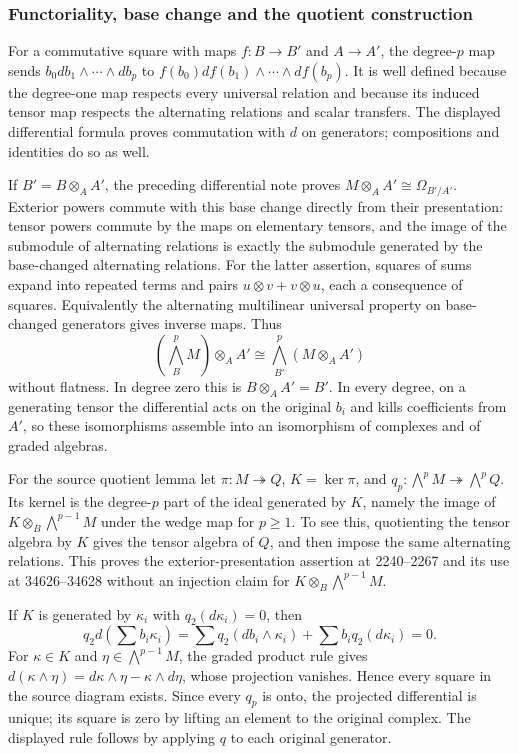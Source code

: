 \subsubsection{Functoriality, base change and the quotient construction}\label{functoriality-base-change-and-the-quotient-construction}

For a commutative square with maps \(f:B\to B'\) and \(A\to A'\), the degree-\(p\) map sends \(b_0db_1\wedge\cdots\wedge db_p\) to \(f(b_0)df(b_1)\wedge\cdots\wedge df(b_p)\). It is well defined because the degree-one map respects every universal relation and because its induced tensor map respects the alternating relations and scalar transfers. The displayed differential formula proves commutation with \(d\) on generators; compositions and identities do so as well.

If \(B'=B\otimes_A A'\), the preceding differential note proves \(M\otimes_A A'\cong\Omega_{B'/A'}\). Exterior powers commute with this base change directly from their presentation: tensor powers commute by the maps on elementary tensors, and the image of the submodule of alternating relations is exactly the submodule generated by the base-changed alternating relations. For the latter assertion, squares of sums expand into repeated terms and pairs \(u\otimes v+v\otimes u\), each a consequence of squares. Equivalently the alternating multilinear universal property on base-changed generators gives inverse maps. Thus \[
(\bigwedge_B^pM)\otimes_A A'\cong\bigwedge_{B'}^p(M\otimes_A A')
\] without flatness. In degree zero this is \(B\otimes_A A'=B'\). In every degree, on a generating tensor the differential acts on the original \(b_i\) and kills coefficients from \(A'\), so these isomorphisms assemble into an isomorphism of complexes and of graded algebras.

For the source quotient lemma let \(\pi:M\twoheadrightarrow Q\), \(K=\ker\pi\), and \(q_p:\bigwedge^pM\twoheadrightarrow\bigwedge^pQ\). Its kernel is the degree-\(p\) part of the ideal generated by \(K\), namely the image of \(K\otimes_B\bigwedge^{p-1}M\) under the wedge map for \(p\ge1\). To see this, quotienting the tensor algebra by \(K\) gives the tensor algebra of \(Q\), and then impose the same alternating relations. This proves the exterior-presentation assertion at 2240--2267 and its use at 34626--34628 without an injection claim for \(K\otimes_B\bigwedge^{p-1}M\).

If \(K\) is generated by \(\kappa_i\) with \(q_2(d\kappa_i)=0\), then \[
q_2d\left(\sum b_i\kappa_i\right)
=\sum q_2(db_i\wedge\kappa_i)+\sum b_iq_2(d\kappa_i)=0.
\] For \(\kappa\in K\) and \(\eta\in\bigwedge^{p-1}M\), the graded product rule gives \(d(\kappa\wedge\eta)=d\kappa\wedge\eta-\kappa\wedge d\eta\), whose projection vanishes. Hence every square in the source diagram exists. Since every \(q_p\) is onto, the projected differential is unique; its square is zero by lifting an element to the original complex. The displayed rule follows by applying \(q\) to each original generator.

